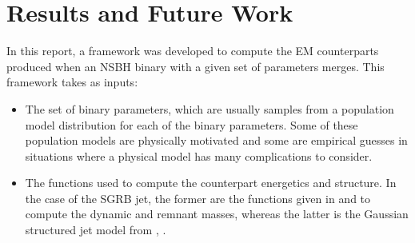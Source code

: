 \chapter{Results and Future Work}\label{ch:results-future}

    In this report, a framework was developed to compute the EM counterparts produced
    when an NSBH binary with a given set of parameters merges. This framework takes as
    inputs:

    \begin{itemize}

        \item The set of binary parameters, which are usually samples from a population
            model distribution for each of the binary parameters. Some of these
            population models are physically motivated and some are empirical guesses
            in situations where a physical model has many complications to consider.

        \item The functions used to compute the counterpart energetics and structure. In
            the case of the SGRB jet, the former are the functions given in
            \cite{kawaguchi_2016} and \cite{foucart_2018} to compute the dynamic and
            remnant masses, whereas the latter is the Gaussian structured jet model from
            \cite{salafia_2015}, \cite{saleem_2020B}.

    \end{itemize}


